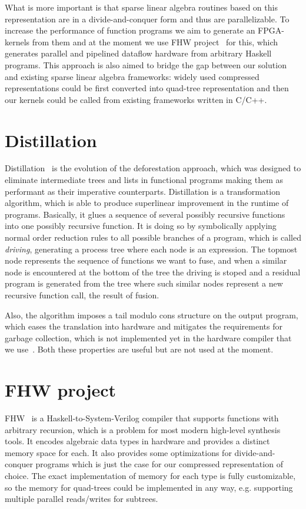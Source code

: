 \documentclass[10pt,conference]{IEEEtran}
\begin{document}
What is more important is that sparse linear algebra routines based on this representation are in a divide-and-conquer form and thus are parallelizable. 
To increase the performance of function programs we aim to generate an FPGA-kernels from them and at the moment we use FHW project~\cite{funcHLS} for this, which generates parallel and pipelined dataflow hardware from arbitrary Haskell programs.
This approach is also aimed to bridge the gap between our solution and existing sparse linear algebra frameworks: widely used compressed representations could be first converted into quad-tree representation and then our kernels could be called from existing frameworks written in C/C++.

\section{Distillation}
Distillation~\cite{distillation} is the evolution of the deforestation approach, which was designed to eliminate intermediate trees and lists in functional programs making them as performant as their imperative counterparts.
Distillation is a transformation algorithm, which is able to produce superlinear improvement in the runtime of programs. 
Basically, it glues a sequence of several possibly recursive functions into one possibly recursive function.
It is doing so by symbolically applying normal order reduction rules to all possible branches of a program, which is called \emph{driving}, generating a process tree where each node is an expression.
The topmost node represents the sequence of functions we want to fuse, and when a similar node is encountered at the bottom of the tree the driving is stoped and a residual program is generated from the tree where such similar nodes represent a new recursive function call, the result of fusion.

Also, the algorithm imposes a tail modulo cons structure on the output program, which 
eases the translation into hardware and mitigates the requirements for garbage collection, which is not implemented yet in the hardware compiler that we use~\cite{funcHLS}. 
Both these properties are useful but are not used at the moment.


\section{FHW project}

FHW~\cite{funcHLS} is a Haskell-to-System-Verilog compiler that supports functions with arbitrary recursion, which is a problem for most modern high-level synthesis tools.
It encodes algebraic data types in hardware and provides a distinct memory space for each.
It also provides some optimizations for divide-and-conquer programs which is just the case for our compressed representation of choice.
The exact implementation of memory for each type is fully customizable, so the memory for quad-trees could be implemented in any way, e.g. supporting multiple parallel reads/writes for subtrees.
\end{document}

